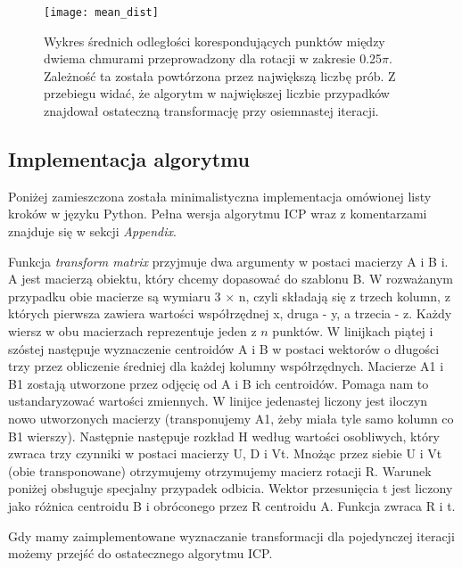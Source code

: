 \documentclass[12pt]{article}
\begin{document}
\begin{figure}[h]
\centering
\texttt{[image: mean\_dist]}
\caption{Wykres średnich odległości korespondujących punktów między dwiema chmurami przeprowadzony dla rotacji w zakresie 0.25$\pi$. Zależność ta została powtórzona przez największą liczbę prób. Z przebiegu widać, że algorytm w największej liczbie przypadków znajdował ostateczną transformację przy osiemnastej iteracji.}
\end{figure}

\newpage
\subsection{Implementacja algorytmu}
Poniżej zamieszczona została minimalistyczna implementacja omówionej listy kroków w języku Python. Pełna wersja algorytmu ICP wraz z komentarzami znajduje się w sekcji \emph{Appendix}.



Funkcja \emph{transform matrix} przyjmuje dwa argumenty w postaci macierzy A i B i. A jest macierzą obiektu, który chcemy dopasować do szablonu B. W rozważanym przypadku obie macierze są wymiaru 3 $\times$ n, czyli składają się z trzech kolumn, z których pierwsza zawiera wartości współrzędnej x, druga - y, a trzecia - z. Każdy wiersz w obu macierzach reprezentuje jeden z $n$ punktów. W linijkach piątej i szóstej następuje wyznaczenie centroidów A i B w postaci wektorów o długości trzy przez obliczenie średniej dla każdej kolumny współrzędnych. Macierze A1 i B1 zostają utworzone przez odjęcię od A i B ich centroidów. Pomaga nam to ustandaryzować wartości zmiennych. W linijce jedenastej liczony jest iloczyn nowo utworzonych macierzy (transponujemy A1, żeby miała tyle samo kolumn co B1 wierszy). Następnie następuje rozkład H według wartości osobliwych, który zwraca trzy czynniki w postaci macierzy U, D i Vt. Mnożąc przez siebie U i Vt (obie transponowane) otrzymujemy otrzymujemy macierz rotacji R. Warunek poniżej obsługuje specjalny przypadek odbicia. Wektor przesunięcia t jest liczony jako różnica centroidu B i obróconego przez R centroidu A. Funkcja zwraca R i t.

Gdy mamy zaimplementowane wyznaczanie transformacji dla pojedynczej iteracji możemy przejść do ostatecznego algorytmu ICP.


\end{document}
